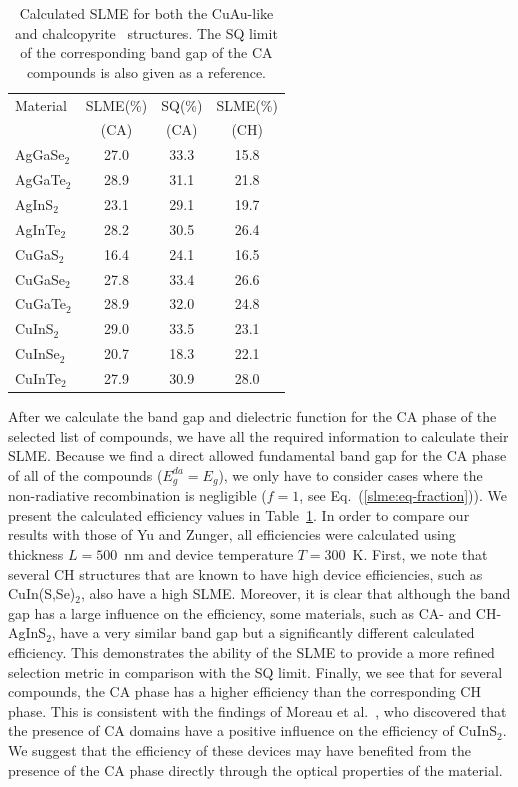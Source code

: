 \begin{refsection}
\begin{table}
\centering 
\captionsetup{width=0.45\textwidth}
\renewcommand{\arraystretch}{1.3} 
\caption{Calculated SLME for both the \mbox{CuAu-like} and 
chalcopyrite~\cite{Yu2012} structures. The SQ limit of the corresponding band 
gap of the CA compounds is also given as a reference.} 
\label{slme:tab-SLME} 
\begin{tabular}{l@{\hskip 1.5em}c@{\hskip 0.8em}c@{\hskip0.8em}c} 
\hline 
Material & SLME(\%) & SQ(\%) & SLME(\%)\\ 
		 &  (CA)	&  (CA) &  (CH)	 \\\hline 
AgGaSe$_2$ & 27.0 & 33.3 & 15.8 \\ 
AgGaTe$_2$ & 28.9 & 31.1 & 21.8 \\ 
AgInS$_2$  & 23.1 & 29.1 & 19.7 \\ 
AgInTe$_2$ & 28.2 & 30.5 & 26.4 \\ 
CuGaS$_2$  & 16.4 & 24.1 & 16.5 \\ 
CuGaSe$_2$ & 27.8 & 33.4 & 26.6 \\ 
CuGaTe$_2$ & 28.9 & 32.0 & 24.8 \\ 
CuInS$_2$  & 29.0 & 33.5 & 23.1 \\ 
CuInSe$_2$ & 20.7 & 18.3 & 22.1 \\ 
CuInTe$_2$ & 27.9 & 30.9 & 28.0 \\ \hline 
\end{tabular} 
\end{table}

After we calculate the band gap and dielectric function for the CA phase of 
the selected list of compounds, we have all the required information to 
calculate their SLME. Because we find a direct allowed fundamental band gap 
for the CA phase of all of the compounds ($E_g^{da}=E_g$), we only have to 
consider cases where the non-radiative recombination is negligible ($f = 1$, 
see Eq.~(\ref{slme:eq-fraction})). We present the calculated efficiency values 
in Table~\ref{slme:tab-SLME}. In order to compare our results with those of Yu 
and Zunger, all efficiencies were calculated using thickness $L = 
500$~\si{\nano\meter} and device temperature \mbox{$T = 300$~\si{\kelvin}}. 
First, we note that several CH structures that are known to have high device 
efficiencies, such as CuIn(S,Se)$_{2}$, also have a high SLME. Moreover, it is 
clear that although the band gap has a large influence on the efficiency, some 
materials, such as CA- and \mbox{CH-AgInS$_2$}, have a very similar band gap 
but a significantly different calculated efficiency. This demonstrates the 
ability of the SLME to provide a more refined selection metric in comparison 
with the SQ limit. Finally, we see that for several compounds, the CA phase 
has a higher efficiency than the corresponding CH phase. This is consistent 
with the findings of Moreau et al.~\cite{Moreau2015}, who discovered that the 
presence of CA domains have a positive influence on the efficiency of 
CuInS$_2$. We suggest that the efficiency of these devices may have benefited 
from the presence of the CA phase directly through the optical properties of 
the material. 
 

\end{refsection}
